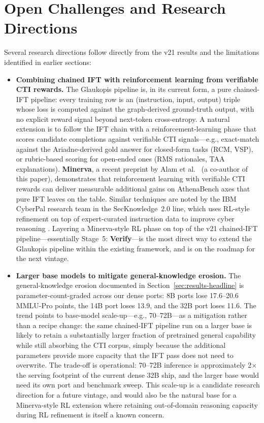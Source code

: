 \documentclass[webpdf,contemporary,large]{oup-authoring-template}
\theoremstyle{thmstyleone}
\theoremstyle{thmstyletwo}
\theoremstyle{thmstylethree}
\begin{document}
\section{Open Challenges and Research Directions}
\label{sec:open-challenges}

Several research directions follow directly from the v21 results and the limitations identified in earlier sections:

\begin{itemize}
  \item \textbf{Combining chained IFT with reinforcement learning from verifiable CTI rewards.} The Glaukopis pipeline is, in its current form, a pure chained-IFT pipeline: every training row is an (instruction, input, output) triple whose loss is computed against the graph-derived ground-truth output, with no explicit reward signal beyond next-token cross-entropy. A natural extension is to follow the IFT chain with a reinforcement-learning phase that scores candidate completions against verifiable CTI signals---e.g., exact-match against the Ariadne-derived gold answer for closed-form tasks (RCM, VSP), or rubric-based scoring for open-ended ones (RMS rationales, TAA explanations). \textbf{Minerva}, a recent preprint by Alam et al.\ \cite{alam2026minerva} (a co-author of this paper), demonstrates that reinforcement learning with verifiable CTI rewards can deliver measurable additional gains on AthenaBench axes that pure IFT leaves on the table. Similar techniques are noted by the IBM CyberPal research team in the SecKnowledge~2.0 line, which uses RL-style refinement on top of expert-curated instruction data to improve cyber reasoning \cite{levi2025toward}. Layering a Minerva-style RL phase on top of the v21 chained-IFT pipeline---essentially Stage~5: \textbf{Verify}---is the most direct way to extend the Glaukopis pipeline within the existing framework, and is on the roadmap for the next vintage.
  \item \textbf{Larger base models to mitigate general-knowledge erosion.} The general-knowledge erosion documented in Section~\ref{sec:results-headline} is parameter-count-graded across our dense ports: 8B ports lose 17.6--20.6 MMLU-Pro points, the 14B port loses 13.9, and the 32B port loses 11.6. The trend points to base-model scale-up---e.g., 70--72B---as a mitigation rather than a recipe change: the same chained-IFT pipeline run on a larger base is likely to retain a substantially larger fraction of pretrained general capability while still absorbing the CTI corpus, simply because the additional parameters provide more capacity that the IFT pass does not need to overwrite. The trade-off is operational: 70--72B inference is approximately 2$\times$ the serving footprint of the current dense 32B ship, and the larger base would need its own port and benchmark sweep. This scale-up is a candidate research direction for a future vintage, and would also be the natural base for a Minerva-style RL extension where retaining out-of-domain reasoning capacity during RL refinement is itself a known concern.

\end{itemize}
\end{document}
